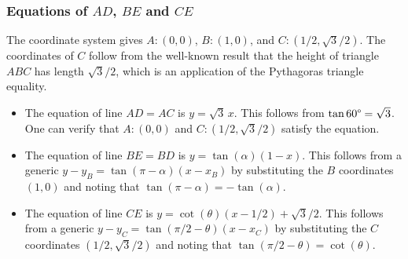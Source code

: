 \subsubsection*{Equations of $AD$, $BE$ and $CE$}
The coordinate system gives $A:(0,0)$, $B:(1,0)$, and $C:(1/2,\sqrt{3}/2)$. The coordinates of $C$ follow from the well-known result that the height of triangle $ABC$ has length $\sqrt{3}/2$, which is an application of the Pythagoras triangle equality. 
\begin{itemize}
\item The equation of line $AD=AC$ is $y=\sqrt{3}\,x$. This follows from $\tan60\degree=\sqrt{3}$. One can verify that $A:(0,0)$ and $C:(1/2,\sqrt{3}/2)$ satisfy the equation. 
\item The equation of line $BE=BD$ is $y=\tan(\alpha)(1-x)$. This follows from a generic $y-y_{B}=\tan(\pi-\alpha)(x-x_{B})$ by substituting the $B$ coordinates $(1,0)$ and noting that $\tan(\pi-\alpha)=-\tan(\alpha)$. 
\item The equation of line $CE$ is $y=\cot(\theta)(x-1/2)+\sqrt{3}/2$. This follows from a generic $y-y_{C}=\tan(\pi/2-\theta)(x-x_{C})$ by substituting the $C$ coordinates $(1/2,\sqrt{3}/2)$ and noting that $\tan(\pi/2-\theta)=\cot(\theta)$. 
\end{itemize}


